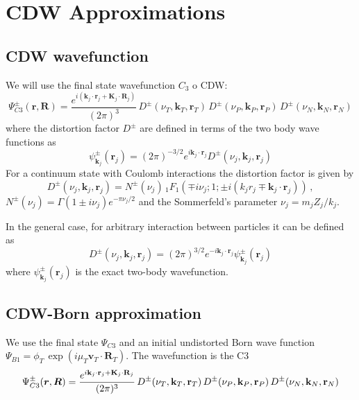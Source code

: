 \chapter{CDW Approximations}

\section{CDW wavefunction}
We will use the final state wavefunction $C_{3}$ o CDW:
%
\begin{equation}\label{Q:C3}
\Psi^{\pm}_{C3} (\bm{r},\bm{R}) = \frac{e^{i (\bm{k}_j\cdot
\bm{r}_j+\bm{K}_j\cdot \bm{R}_j)}}{(2 \pi)^3} \,
D^{\pm}(\nu_T,\bm{k}_T,\bm{r}_T) \, D^{\pm}(\nu_P,\bm{k}_P,\bm{r}_P)
\,D^{\pm}(\nu_N,\bm{k}_N,\bm{r}_N)
\end{equation}
%
where the distortion factor $D^{\pm}$ are defined in terms of the two body
wave functions as
\[
 \psi^{\pm}_{\bm{k}_j}(\bm{r}_j)  = (2\pi)^{-3/2}e^{i \bm{k}_{j}
 \cdot \bm{r}_{j}} D^{\pm}(\nu_j,\bm{k}_{j},\bm{r}_{j})
\]
%
For a continuum state with Coulomb interactions the distortion factor
is given by
%
\begin{equation}\label{Q:DFactCoul}
 D^{\pm}(\nu_j,\bm{k}_{j},\bm{r}_{j})= N^{\pm}(\nu_{j}) \,{_1F_1}\left(
\mp i \nu_{j};1; {\pm} i (k_{j} r_{j} \mp \bm{k}_{j} \cdot\bm{r}_{j}
) \right) \, ,
\end{equation}
%
$N^{\pm}(\nu_j)= \Gamma(1 {\pm} i\nu_j) e^{-\pi \nu_j/2}$ and the
Sommerfeld's parameter $\nu_j = m_j Z_j/ k_j$.

In the general case, for arbitrary interaction between particles it can
be defined as
\begin{equation}\label{Q:DFact}
D^{\pm}(\nu_j,\bm{k}_j,\bm{r}_j)  = (2\pi)^{3/2}e^{ - i\bm{k}_j \cdot
\bm{r}_j} \psi^{\pm}_{\bm{k}_j}(\bm{r}_j)
\end{equation}
where $\psi^{\pm}_{\bm{k}_j}(\bm{r}_j)$ is the exact two-body wavefunction.


\section{CDW-Born approximation}

We use the final state $\Psi_{C3}$ and an initial undistorted Born wave
function $\Psi_{B1}=\phi_{T} \, \exp{ \left( i \mu_{T} \bm{v}_{T}
\cdot \bm{R}_{T} \right)}$. The wavefunction is the C3
\begin{equation} \label{Q:FCC1}
\Psi^{\pm}_{C3} (\bm{r},\bm{R}) = \frac{e^{i {\bf k}_j\cdot {\bf r}_j+{\bf
K}_j\cdot {\bf R}_j}}{(2 \pi)^3} \, D^{\pm}(\nu_T,{\bf k}_T,{\bf r}_T) \,
D^{\pm}(\nu_P,{\bf k}_P,{\bf r}_P) \,D^{\pm}(\nu_N,{\bf k}_N,{\bf r}_N)
\end{equation}

